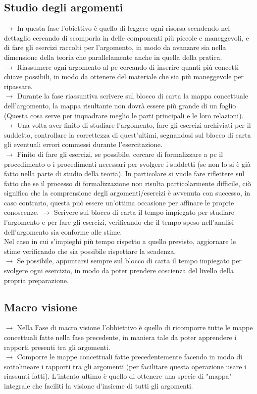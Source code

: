 \documentclass[11pt,a4paper]{article}
\begin{document}
\subsection{Studio degli argomenti}
$\rightarrow$ In questa fase l'obiettivo è quello di leggere ogni risorsa scendendo nel dettaglio cercando di scomporla in delle componenti più piccole e maneggevoli, e di fare gli esercizi raccolti per l'argomento, in modo da avanzare sia nella dimensione della teoria che parallelamente anche in quella della pratica.\\
$\rightarrow$ Riassumere ogni argomento al pc cercando di inserire quanti più concetti chiave possibili, in modo da ottenere del materiale che sia più maneggevole per ripassare.\\
$\rightarrow$ Durante la fase riassuntiva scrivere sul blocco di carta la mappa concettuale dell'argomento, la mappa risultante non dovrà essere più grande di un foglio (Questa cosa serve per inquadrare meglio le parti principali e le loro relazioni).\\
$\rightarrow$ Una volta aver finito di studiare l'argomento, fare gli esercizi archiviati per il suddetto, controllare la correttezza di quest'ultimi, segnandosi sul blocco di carta gli eventuali errori commessi durante l'esercitazione.\\
$\rightarrow$ Finito di fare gli esercizi, se possibile, cercare di formalizzare a pc il procedimento o i procedimenti necessari per svolgere i suddetti (se non lo si è già fatto nella parte di studio della teoria). In particolare si vuole fare riflettere sul fatto che se il processo di formalizzazione non risulta particolarmente difficile, ciò significa che la comprensione degli argomenti/esercizi è avvenuta con successo, in caso contrario, questa può essere un'ottima occasione per affinare le proprie conoscenze.
$\rightarrow$ Scrivere sul blocco di carta il tempo impiegato per studiare l'argomento e per fare gli esercizi, verificando che il tempo speso nell'analisi dell'argomento sia conforme alle stime.\\
Nel caso in cui s'impieghi più tempo rispetto a quello previsto, aggiornare le stime verificando che sia possibile rispettare la scadenza.\\
$\rightarrow$ Se possibile, appuntarsi sempre sul blocco di carta il tempo impiegato per svolgere ogni esercizio, in modo da poter prendere coscienza del livello della propria preparazione.\\

\subsection{Macro visione}
$\rightarrow$ Nella Fase di macro visione l'obbiettivo è quello di ricomporre tutte le mappe concettuali fatte nella fase precedente, in maniera tale da poter apprendere i rapporti presenti tra gli argomenti.\\
$\rightarrow$ Comporre le mappe concettuali fatte precedentemente facendo in modo di sottolineare i rapporti tra gli argomenti (per facilitare questa operazione usare i riassunti fatti). L'intento ultimo è quello di ottenere una specie di "mappa" integrale che faciliti la visione d'insieme di tutti gli argomenti. \\
\end{document}
